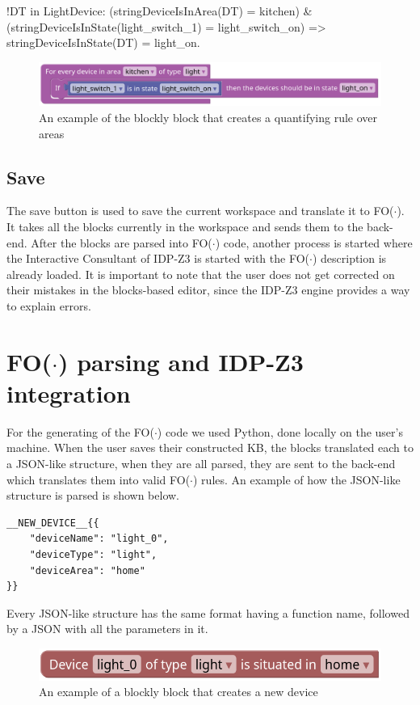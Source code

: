 \documentclass[11pt,a4paper]{report}
\newcommand{\fodot}{FO($\cdot$)\xspace}
\begin{document}
\begin{idplisting}
!DT in LightDevice: (stringDeviceIsInArea(DT) = kitchen) & (stringDeviceIsInState(light_switch_1) = light_switch_on) => stringDeviceIsInState(DT) = light_on.

\begin{figure}
    \centering
    \includegraphics[width=0.8\linewidth]{images/homy_enumerate_rule_area.png}
    \caption{An example of the blockly block that creates a quantifying rule over areas}
    \label{fig:homy_enumerate_rule_area}
\end{figure}

\subsection{Save}
The save button is used to save the current workspace and translate it to \fodot. It takes all the blocks currently in the workspace and sends them to the back-end. After the blocks are parsed into \fodot code, another process is started where the Interactive Consultant of IDP-Z3 is started with the \fodot description is already loaded. It is important to note that the user does not get corrected on their mistakes in the blocks-based editor, since the IDP-Z3 engine provides a way to explain errors.

\section{\fodot parsing and IDP-Z3 integration}
For the generating of the \fodot code we used Python, done locally on the user's machine. When the user saves their constructed KB, the blocks translated each to a JSON-like structure, when they are all parsed, they are sent to the back-end which translates them into valid \fodot rules.
An example of how the JSON-like structure is parsed is shown below.
\begin{verbatim}
__NEW_DEVICE__{{
    "deviceName": "light_0", 
    "deviceType": "light", 
    "deviceArea": "home"
}}
\end{verbatim}
Every JSON-like structure has the same format having a function name, followed by a JSON with all the parameters in it.

\begin{figure}
    \centering
    \includegraphics[width=0.8\linewidth]{images/blockly_new_device.png}
    \caption{An example of a blockly block that creates a new device}
    \label{fig:blockly_new_device}
\end{figure}


\end{idplisting}
\end{document}
